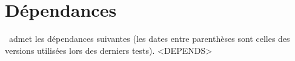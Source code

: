 \documentclass{main}
\begin{document}
\section{Dépendances}

\thisproj\ admet les dépendances suivantes (les dates entre parenthèses sont celles des versions utilisées lors des derniers tests).
<DEPENDS>
\end{document}
